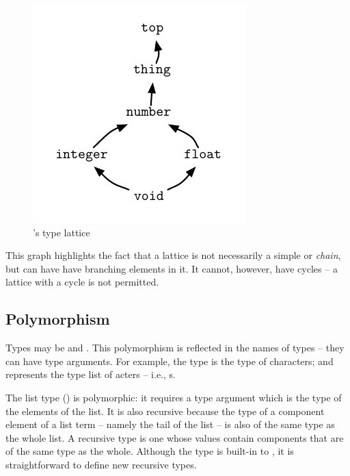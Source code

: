 \begin{figure}
\centerline{\includegraphics{numberlattice}}
\caption{\label{type:lattice:number}\go's  type lattice}
\end{figure}

This graph highlights the fact that a lattice is not necessarily a simple  or \emph{chain}, but can have have branching elements in it. It cannot, however, have cycles -- a lattice with a cycle is not permitted.

\subsection{Polymorphism}
Types  may be  and . This polymorphism is reflected in the names of types -- they can have type arguments. For example, the  type is the type of characters; and  represents the type list  of acters -- i.e., s.

The list type () is polymorphic: it requires a type argument which is the type of the elements of the list. It is also recursive because the type of a component element of a list term -- namely the tail of the list -- is also of the same type as the whole list.  A recursive type is one whose values contain components that are of the same type as the whole. Although the  type is built-in to \go, it is straightforward to define new recursive types. 

